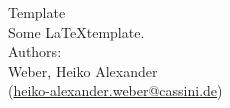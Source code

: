 \begin{titlepage}
    \begin{center}
        {\Huge
            Template
        }
    	\\
    	\vspace*{2cm}
        {\Large
        	Some \LaTeX template.
        }
    	\vspace*{2cm}
    	\\
    	{\large
    		Authors: \\ \vspace*{1cm}
            Weber, Heiko Alexander\\(\href{mailto://heiko-alexander.weber@cassini.de}{heiko-alexander.weber@cassini.de})
    	}
    \end{center}
\end{titlepage}